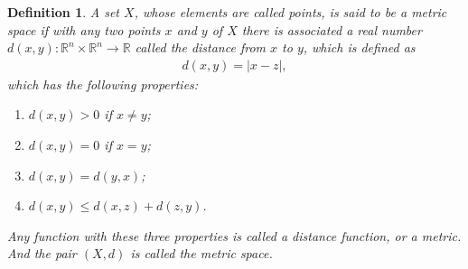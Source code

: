 \documentclass[11pt]{book}
\newtheorem{definition}{Definition}[chapter]
\theoremstyle{definition}
\numberwithin{equation}{chapter}
\begin{document}
\begin{definition}
A set $X$, whose elements are called points, is said to be a metric space if with any two points $x$ and $y$ of $X$ there is associated a real number $d(x,y): \mathbb{R}^n \times \mathbb{R}^n \rightarrow \mathbb{R}$ called the distance from $x$ to $y$, which is defined as 
\begin{align*}
    d(x,y) = \left|x - z\right|,
\end{align*}
which has the following properties:
\begin{enumerate}[label=(\alph*)]
    \item $d(x,y) > 0$ if $x\neq y$;
    \item $d(x,y) = 0$ if $x = y$;
    \item $d(x,y) = d(y,x)$;
    \item $d(x,y) \leq d(x,z) + d(z,y)$.
\end{enumerate}
Any function with these three properties is called a distance function, or a metric. And the pair $(X,d)$ is called the metric space.
\end{definition}

\medskip
\end{document}
